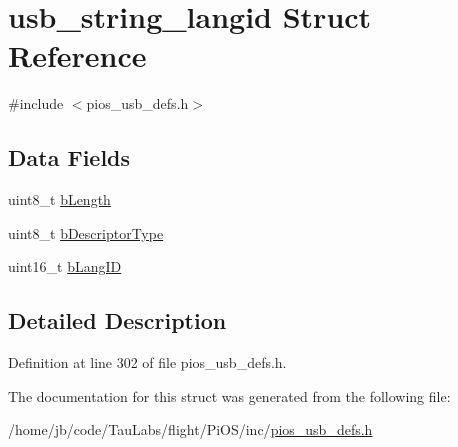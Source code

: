 \hypertarget{structusb__string__langid}{\section{usb\-\_\-string\-\_\-langid \-Struct \-Reference}
\label{structusb__string__langid}
}


{\ttfamily \#include $<$pios\-\_\-usb\-\_\-defs.\-h$>$}

\subsection*{\-Data \-Fields}
\begin{DoxyCompactItemize}
\item 
uint8\-\_\-t \hyperlink{group___p_i_o_s___u_s_b___d_e_f_s_ga5d1ac83f6f30a062e5f6d89c4aa15c44}{b\-Length}
\item 
uint8\-\_\-t \hyperlink{group___p_i_o_s___u_s_b___d_e_f_s_gafbb47b004fd7a76505e51c1f1530351f}{b\-Descriptor\-Type}
\item 
uint16\-\_\-t \hyperlink{group___p_i_o_s___u_s_b___d_e_f_s_ga0a47e7587d6595703617971546741a5f}{b\-Lang\-I\-D}
\end{DoxyCompactItemize}


\subsection{\-Detailed \-Description}


\-Definition at line 302 of file pios\-\_\-usb\-\_\-defs.\-h.



\-The documentation for this struct was generated from the following file\-:\begin{DoxyCompactItemize}
\item 
/home/jb/code/\-Tau\-Labs/flight/\-Pi\-O\-S/inc/\hyperlink{pios__usb__defs_8h}{pios\-\_\-usb\-\_\-defs.\-h}\end{DoxyCompactItemize}
